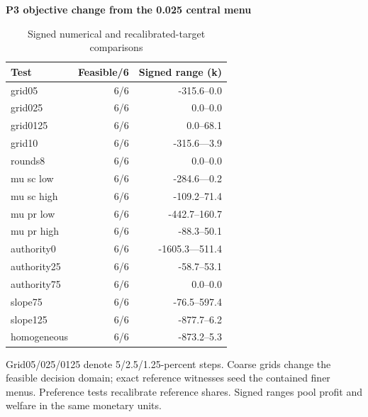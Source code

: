 \begin{table}[htbp]\centering
\caption{Signed numerical and recalibrated-target comparisons}\label{tab:review_numerics}
\begin{minipage}{.95\textwidth}\fontsize{8}{10}\selectfont{}\setlength{\tabcolsep}{2pt}\renewcommand{\arraystretch}{1.08}
\par\noindent\textbf{P3 objective change from the 0.025 central menu}\par\smallskip
\begin{tabular*}{\linewidth}{@{\extracolsep{\fill}}lrr@{}}\toprule
Test & Feasible/6 & Signed range (k) \\
\midrule
grid05 & 6/6 & -315.6--0.0 \\
grid025 & 6/6 & 0.0--0.0 \\
grid0125 & 6/6 & 0.0--68.1 \\
grid10 & 6/6 & -315.6---3.9 \\
rounds8 & 6/6 & 0.0--0.0 \\
mu sc low & 6/6 & -284.6---0.2 \\
mu sc high & 6/6 & -109.2--71.4 \\
mu pr low & 6/6 & -442.7--160.7 \\
mu pr high & 6/6 & -88.3--50.1 \\
authority0 & 6/6 & -1605.3---511.4 \\
authority25 & 6/6 & -58.7--53.1 \\
authority75 & 6/6 & 0.0--0.0 \\
slope75 & 6/6 & -76.5--597.4 \\
slope125 & 6/6 & -877.7--6.2 \\
homogeneous & 6/6 & -873.2--5.3 \\
\bottomrule\end{tabular*}\par\medskip
\par\noindent\fontsize{8}{9.5}\selectfont Grid05/025/0125 denote 5/2.5/1.25-percent steps. Coarse grids change the feasible decision domain; exact reference witnesses seed the contained finer menus. Preference tests recalibrate reference shares. Signed ranges pool profit and welfare in the same monetary units.
\end{minipage}\end{table}
